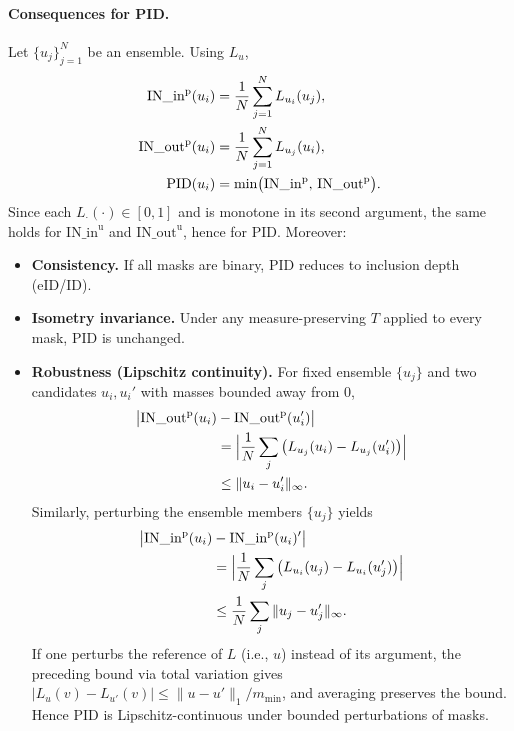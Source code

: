 \documentclass[review,journal]{vgtc}              %
\begin{document}
\paragraph{Consequences for PID.}
Let $\{u_j\}_{j=1}^N$ be an ensemble. Using $L_u$,
\begin{align}
\mathrm{IN\_in}^{\mathrm p}(u_i) &= \frac1N\sum_{j=1}^N L_{u_i}(u_j), \notag \\
\mathrm{IN\_out}^{\mathrm p}(u_i) &= \frac1N\sum_{j=1}^N L_{u_j}(u_i), \notag \\
\mathrm{PID}(u_i) &= \min\bigl(\mathrm{IN\_in}^{\mathrm p},\,\mathrm{IN\_out}^{\mathrm p}\bigr).
\end{align}
Since each $L_{\cdot}(\cdot)\in[0,1]$ and is monotone in its second argument, the same holds for
$\mathrm{IN\_in}^{\mathrm u}$ and $\mathrm{IN\_out}^{\mathrm u}$, hence for $\mathrm{PID}$.
Moreover:
\begin{itemize}
\item \textbf{Consistency.} If all masks are binary, $\mathrm{PID}$ reduces to inclusion depth (eID/ID).
\item \textbf{Isometry invariance.} Under any measure-preserving $T$ applied to every mask,
$\mathrm{PID}$ is unchanged.
\item \textbf{Robustness (Lipschitz continuity).}
For fixed ensemble $\{u_j\}$ and two candidates $u_i,u_i'$ with masses bounded away from $0$,
\begin{align}
\big|\mathrm{IN\_out}^{\mathrm p}(u_i)&-\mathrm{IN\_out}^{\mathrm p}(u_i')\big| \notag \\
&= \Big|\frac1N\sum_{j} \big(L_{u_j}(u_i)-L_{u_j}(u_i')\big)\Big| \notag \\
&\le \|u_i-u_i'\|_\infty .
\end{align}
Similarly, perturbing the ensemble members $\{u_j\}$ yields
\begin{align}
\big|\mathrm{IN\_in}^{\mathrm p}(u_i)&-\mathrm{IN\_in}^{\mathrm p}(u_i)'\big| \notag \\
&= \Big|\frac1N\sum_{j} \big(L_{u_i}(u_j)-L_{u_i}(u_j')\big)\Big| \notag \\
&\le \frac1N\sum_j \|u_j-u_j'\|_\infty .
\end{align}
If one perturbs the reference of $L$ (i.e., $u$) instead of its argument, the preceding 
bound via total variation gives
$|L_{u}(v)-L_{u'}(v)|\le \|u-u'\|_1/m_{\min}$, and averaging preserves the bound.
Hence $\mathrm{PID}$ is Lipschitz-continuous under bounded perturbations of masks.
\end{itemize}
\end{document}
